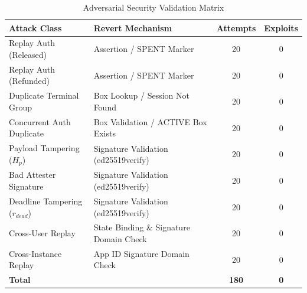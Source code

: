 \begin{table}[h]
\centering
\caption{Adversarial Security Validation Matrix}
\label{tab:adversarial_matrix}
\begin{tabular}{llcc}
\toprule
\textbf{Attack Class} & \textbf{Revert Mechanism} & \textbf{Attempts} & \textbf{Exploits} \\ \midrule
Replay Auth (Released) & Assertion / SPENT Marker & 20 & 0 \\
Replay Auth (Refunded) & Assertion / SPENT Marker & 20 & 0 \\
Duplicate Terminal Group & Box Lookup / Session Not Found & 20 & 0 \\
Concurrent Auth Duplicate & Box Validation / ACTIVE Box Exists & 20 & 0 \\
Payload Tampering ($H_p$) & Signature Validation (ed25519verify) & 20 & 0 \\
Bad Attester Signature & Signature Validation (ed25519verify) & 20 & 0 \\
Deadline Tampering ($r_{dead}$) & Signature Validation (ed25519verify) & 20 & 0 \\
Cross-User Replay & State Binding \& Signature Domain Check & 20 & 0 \\
Cross-Instance Replay & App ID Signature Domain Check & 20 & 0 \\ \midrule
\textbf{Total} & & \textbf{180} & \textbf{0} \\
\bottomrule
\end{tabular}
\end{table}
